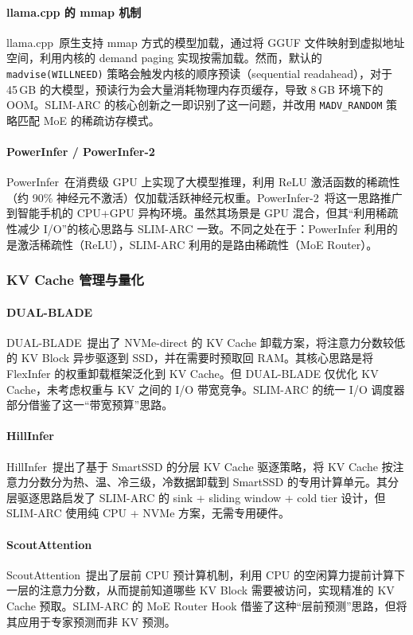 \paragraph{llama.cpp 的 mmap 机制}
llama.cpp~\cite{llamacpp2024}原生支持 mmap 方式的模型加载，通过将 GGUF 文件映射到虚拟地址空间，利用内核的 demand paging 实现按需加载。然而，默认的 \texttt{madvise(WILLNEED)} 策略会触发内核的顺序预读（sequential readahead），对于 45\,GB 的大模型，预读行为会大量消耗物理内存页缓存，导致 8\,GB 环境下的 OOM。SLIM-ARC 的核心创新之一即识别了这一问题，并改用 \texttt{MADV\_RANDOM} 策略匹配 MoE 的稀疏访存模式。

\paragraph{PowerInfer / PowerInfer-2}
PowerInfer~\cite{powerinfer2024}在消费级 GPU 上实现了大模型推理，利用 ReLU 激活函数的稀疏性（约 90\% 神经元不激活）仅加载活跃神经元权重。PowerInfer-2~\cite{powerinfer2_2024}将这一思路推广到智能手机的 CPU+GPU 异构环境。虽然其场景是 GPU 混合，但其“利用稀疏性减少 I/O”的核心思路与 SLIM-ARC 一致。不同之处在于：PowerInfer 利用的是激活稀疏性（ReLU），SLIM-ARC 利用的是路由稀疏性（MoE Router）。

\subsubsection{KV Cache 管理与量化}

\paragraph{DUAL-BLADE}
DUAL-BLADE~\cite{dualblade2024}提出了 NVMe-direct 的 KV Cache 卸载方案，将注意力分数较低的 KV Block 异步驱逐到 SSD，并在需要时预取回 RAM。其核心思路是将 FlexInfer 的权重卸载框架泛化到 KV Cache。但 DUAL-BLADE 仅优化 KV Cache，未考虑权重与 KV 之间的 I/O 带宽竞争。SLIM-ARC 的统一 I/O 调度器部分借鉴了这一“带宽预算”思路。

\paragraph{HillInfer}
HillInfer~\cite{hillinfer2024}提出了基于 SmartSSD 的分层 KV Cache 驱逐策略，将 KV Cache 按注意力分数分为热、温、冷三级，冷数据卸载到 SmartSSD 的专用计算单元。其分层驱逐思路启发了 SLIM-ARC 的 sink + sliding window + cold tier 设计，但 SLIM-ARC 使用纯 CPU + NVMe 方案，无需专用硬件。

\paragraph{ScoutAttention}
ScoutAttention~\cite{scoutattention2024}提出了层前 CPU 预计算机制，利用 CPU 的空闲算力提前计算下一层的注意力分数，从而提前知道哪些 KV Block 需要被访问，实现精准的 KV Cache 预取。SLIM-ARC 的 MoE Router Hook 借鉴了这种“层前预测”思路，但将其应用于专家预测而非 KV 预测。

